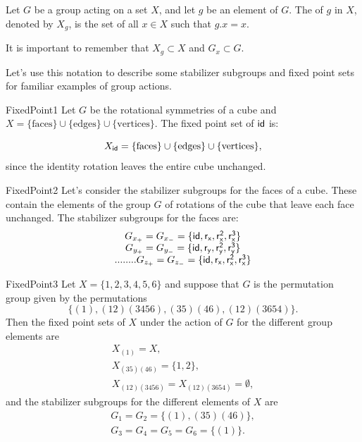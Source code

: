\begin{defn} \label{FixedPoint}
Let $G$ be a group acting on a set $X$, and let $g$ be
an element of $G$. The  of $g$ in $X$, denoted by $X_g$, is the set of 
all $x \in X$ such that $g.x = x$.
\end{defn}
\noindent
It is important to remember that $X_g \subset X$ and $G_x \subset G$. 

Let's use this notation to describe some stabilizer subgroups and fixed point sets for familiar examples of group actions.

\begin{example}{FixedPoint1}
Let $G$ be the rotational symmetries of a cube and $X=\{\text{faces}\}\cup\{\text{edges}\}\cup\{\text{vertices}\}$.
The fixed point set of $\sf{id}$ is: 

$$X_{\sf{id}}=\{\text{faces}\}\cup\{\text{edges}\}\cup\{\text{vertices}\},$$
since the identity rotation  leaves the entire cube unchanged.  
\end {example}

\begin{example}{FixedPoint2}
Let's consider the stabilizer subgroups for the faces of a cube.  These contain the elements of the group $G$ of rotations of the cube that leave each face unchanged.  The stabilizer subgroups for the faces are:
$$\begin{array} {c}
G_{x_+}=G_{x_-}=\{\sf{id},r_x,r_x^2,r_x^3\}\\
G_{y_+}=G_{y_-}=\{\sf{id},r_y,r_y^2,r_y^3\}\\......
..G_{z_+}=G_{z_-}=\{\sf{id},r_x,r_x^2,r_x^3\}
\end {array}$$
\end{example}

\begin{example}{FixedPoint3}
Let $X = \{1, 2, 3, 4, 5, 6\}$ and suppose that $G$ is the permutation
group given by the permutations 
$$\{(1), (1 2)(3 4 5 6), (3 5)(4 6), (1 2)( 3 6 5 4)\}.$$
Then the fixed point sets of $X$ under the action of $G$ for the different group elements are
$$
\begin{array}{c}
X_{(1)} = X, \\
X_{(3 5)(4 6)} = \{1,2\}, \\
X_{(1 2)(3 4 5 6)} = X_{(1 2)(3 6 5 4)} = \emptyset,
\end{array}
$$
and the stabilizer subgroups for the different elements of $X$ are
$$
\begin{array}{c}
G_1 = G_2 = \{(1), (3 5)(4 6) \}, \\
G_3 = G_4 = G_5 = G_6 = \{(1)\}.
\end{array}
$$
\end{example}

